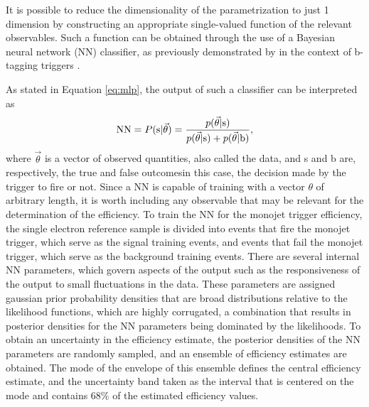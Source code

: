 It is possible to reduce the dimensionality of the parametrization to just 1 dimension by constructing an appropriate single-valued function of the relevant observables. Such a function can be obtained through the use of a Bayesian neural network (NN) classifier, as previously demonstrated by in the context of b-tagging triggers \cite{bib:SezenTrigger}. 

As stated in Equation \ref{eq:mlp}, the output of such a classifier can be interpreted as
\begin{equation}
\text{NN} = P(\text{s}|\vec{\theta}) = \frac{p(\vec{\theta} | {\rm s})}{p(\vec{\theta} | {\rm s})+p(\vec{\theta} | {\rm b})},
\end{equation}
where $\vec{\theta}$ is a vector of observed quantities, also called the data, and s and b are, respectively, the true and false outcomes\textemdash in this case, the decision made by the trigger to fire or not. Since a NN is capable of training with a vector $\theta$ of arbitrary length, it is worth including any observable that may be relevant for the determination of the efficiency. To train the NN for the monojet trigger efficiency, the single electron reference sample is divided into events that fire the monojet trigger, which serve as the signal training events, and events that fail the monojet trigger, which serve as the background training events. There are several internal NN parameters, which govern aspects of the output such as the responsiveness of the output to small fluctuations in the data. These parameters are assigned gaussian prior probability densities that are broad distributions relative to the likelihood functions, which are highly corrugated, a combination that results in posterior densities for the NN parameters being dominated by the likelihoods. To obtain an uncertainty in the efficiency estimate, the posterior densities of the NN parameters are randomly sampled, and an ensemble of efficiency estimates are obtained. The mode of the envelope of this ensemble defines the central efficiency estimate, and the uncertainty band taken as the interval that is centered on the mode and contains 68\% of the estimated efficiency values. 


